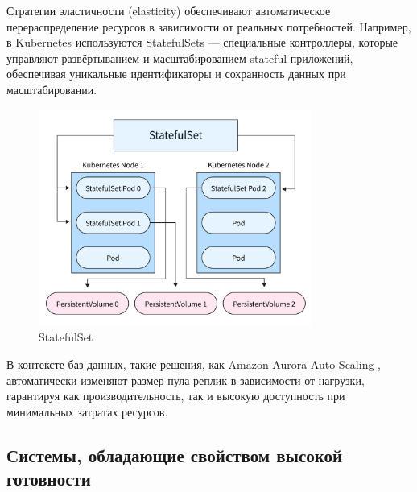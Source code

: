 Стратегии эластичности (elasticity) обеспечивают автоматическое перераспределение ресурсов в зависимости от реальных потребностей. Например, в Kubernetes используются StatefulSets \autocite{StatefulSetsApps} — специальные контроллеры, которые управляют развёртыванием и масштабированием stateful-приложений, обеспечивая уникальные идентификаторы и сохранность данных при масштабировании. 


\begin{figure}[H]
    \centering
    \includegraphics[width=0.8\textwidth]{assets/StatefulSet.png}
    \caption{StatefulSet}
    \label{fig:Scaling2}
\end{figure}

В контексте баз данных, такие решения, как Amazon Aurora Auto Scaling \autocite{AuroraAutoScaling}, автоматически изменяют размер пула реплик в зависимости от нагрузки, гарантируя как производительность, так и высокую доступность при минимальных затратах ресурсов.







\subsection{Системы, обладающие свойством высокой готовности}
